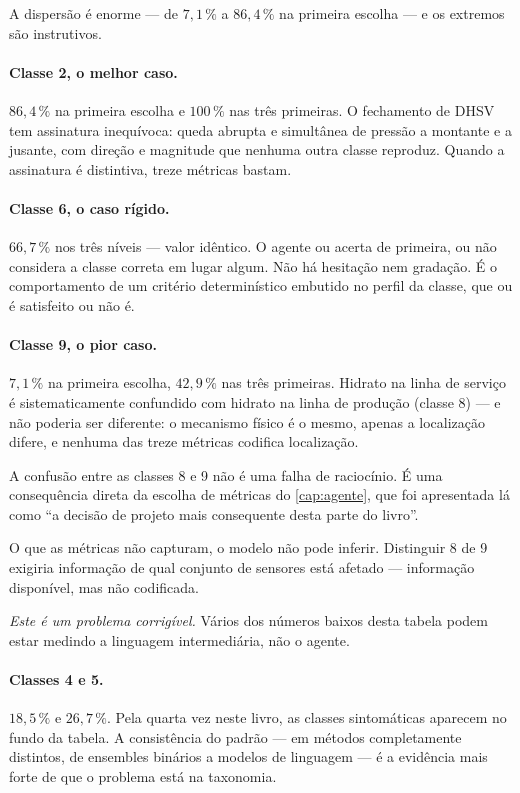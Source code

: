 A dispersão é enorme --- de $7{,}1\,\%$ a $86{,}4\,\%$ na primeira escolha --- e os
extremos são instrutivos.

\paragraph{Classe 2, o melhor caso.} $86{,}4\,\%$ na primeira escolha e $100\,\%$ nas
três primeiras. O fechamento de DHSV tem assinatura inequívoca: queda abrupta e
simultânea de pressão a montante e a jusante, com direção e magnitude que nenhuma outra
classe reproduz. Quando a assinatura é distintiva, treze métricas bastam.

\paragraph{Classe 6, o caso rígido.} $66{,}7\,\%$ nos três níveis --- valor idêntico. O
agente ou acerta de primeira, ou não considera a classe correta em lugar algum. Não há
hesitação nem gradação. É o comportamento de um critério determinístico embutido no
perfil da classe, que ou é satisfeito ou não é.

\paragraph{Classe 9, o pior caso.} $7{,}1\,\%$ na primeira escolha, $42{,}9\,\%$ nas três
primeiras. Hidrato na linha de serviço é sistematicamente confundido com hidrato na linha
de produção (classe 8) --- e não poderia ser diferente: o mecanismo físico é o mesmo,
apenas a localização difere, e nenhuma das treze métricas codifica localização.

\begin{destaque}
A confusão entre as classes 8 e 9 não é uma falha de raciocínio. É uma consequência
direta da escolha de métricas do \cref{cap:agente}, que foi apresentada lá como ``a
decisão de projeto mais consequente desta parte do livro''.

O que as métricas não capturam, o modelo não pode inferir. Distinguir 8 de 9 exigiria
informação de qual conjunto de sensores está afetado --- informação disponível, mas não
codificada.

\emph{Este é um problema corrigível.} Vários dos números baixos desta tabela podem estar
medindo a linguagem intermediária, não o agente.
\end{destaque}

\paragraph{Classes 4 e 5.} $18{,}5\,\%$ e $26{,}7\,\%$. Pela quarta vez neste livro, as
classes sintomáticas aparecem no fundo da tabela. A consistência do padrão --- em
métodos completamente distintos, de ensembles binários a modelos de linguagem --- é a
evidência mais forte de que o problema está na taxonomia.

